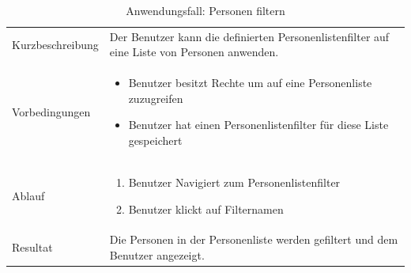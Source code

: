 \begin{table}[h!]
   \begin{tabular}{|L{0.3\textwidth}|L{0.6\textwidth}|}
      \hline
        \\[4pt]
      \hline
      Kurzbeschreibung & Der Benutzer kann die definierten Personenlistenfilter auf eine Liste von Personen 
      anwenden. \\
      \hline
      Vorbedingungen & \begin{itemize}
         \item Benutzer besitzt Rechte um auf eine Personenliste zuzugreifen
         \item Benutzer hat einen Personenlistenfilter für diese Liste gespeichert
         \end{itemize}  \\
      \hline
      Ablauf & \begin{enumerate}
      \item Benutzer Navigiert zum Personenlistenfilter
      \item Benutzer klickt auf Filternamen
      \end{enumerate}  \\
      \hline
      Resultat & Die Personen in der Personenliste werden gefiltert und dem Benutzer angezeigt. \\
      \hline
   \end{tabular}
   \caption{Anwendungsfall: Personen filtern}
\end{table}

\newpage

